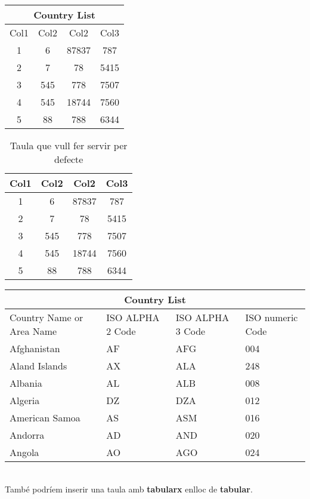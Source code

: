 {\setlength{\extrarowheight}{3pt}%

\begin{center}
 \begin{tabular}{c | c c c} 
 \hline
 \multicolumn{4}{|c|}{Country List} \\
 \hline \hline
 Col1 & Col2 & Col2 & Col3 \\
 \hline
 1 & 6 & 87837 & 787 \\
 2 & 7 & 78 & 5415 \\ 
 3 & 545 & 778 & 7507 \\ 
 4 & 545 & 18744 & 7560 \\
 5 & 88 & 788 & 6344 \\
\end{tabular}
\end{center}

\begin{table}[h!]
\centering
 \begin{tabular}{c | c c c} 
 Col1 & Col2 & Col2 & Col3 \\
 \hline
 1 & 6 & 87837 & 787 \\
 \rowcolor[HTML]{b2f2ff}2 & 7 & 78 & 5415 \\ 
 3 & 545 & 778 & 7507 \\ 
 \rowcolor[HTML]{b2f2ff}4 & 545 & 18744 & 7560 \\
 5 & 88 & 788 & 6344 \\
\end{tabular}
\caption{Taula que vull fer servir per defecte}
\label{table:1}
\end{table}
%
\begin{tabular}{ |p{3cm}||p{3cm}|p{3cm}|p{3cm}|  }
 \hline
 \multicolumn{4}{|c|}{Country List} \\
 \hline
 Country Name     or Area Name& ISO ALPHA 2 Code &ISO ALPHA 3 Code&ISO numeric Code\\
 \hline
 Afghanistan   & AF    &AFG&   004\\
 Aland Islands&   AX  & ALA   &248\\
 Albania &AL & ALB&  008\\
 Algeria    &DZ & DZA&  012\\
 American Samoa&   AS  & ASM&016\\
 Andorra& AD  & AND   &020\\
 Angola& AO  & AGO&024\\
 \hline
\end{tabular}
%
\\
\newline
També podríem inserir una taula amb \textbf{tabularx} enlloc de \textbf{tabular}.\\
}
